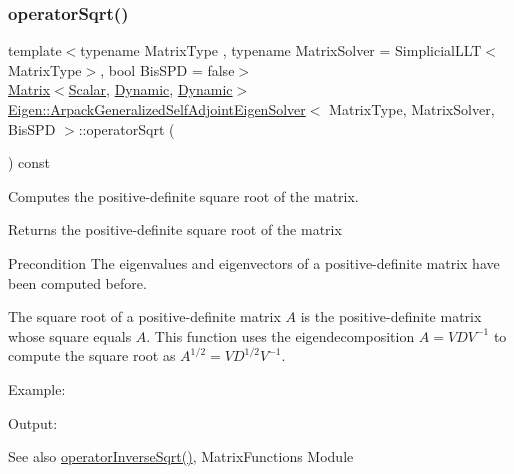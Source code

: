 \subsubsection{\texorpdfstring{operator\+Sqrt()}{operatorSqrt()}\hspace{0.1cm}{\footnotesize\ttfamily [1/2]}}
{\footnotesize\ttfamily template$<$typename Matrix\+Type , typename Matrix\+Solver  = Simplicial\+L\+L\+T$<$\+Matrix\+Type$>$, bool Bis\+S\+PD = false$>$ \\
\hyperlink{group___core___module_class_eigen_1_1_matrix}{Matrix}$<$\hyperlink{class_eigen_1_1_arpack_generalized_self_adjoint_eigen_solver_ab1182405bfe87a505d4b7a8311c661ec}{Scalar}, \hyperlink{namespace_eigen_ad81fa7195215a0ce30017dfac309f0b2}{Dynamic}, \hyperlink{namespace_eigen_ad81fa7195215a0ce30017dfac309f0b2}{Dynamic}$>$ \hyperlink{class_eigen_1_1_arpack_generalized_self_adjoint_eigen_solver}{Eigen\+::\+Arpack\+Generalized\+Self\+Adjoint\+Eigen\+Solver}$<$ Matrix\+Type, Matrix\+Solver, Bis\+S\+PD $>$\+::operator\+Sqrt (\begin{DoxyParamCaption}{ }\end{DoxyParamCaption}) const\hspace{0.3cm}{\ttfamily [inline]}}



Computes the positive-\/definite square root of the matrix. 

\begin{DoxyReturn}{Returns}
the positive-\/definite square root of the matrix
\end{DoxyReturn}
\begin{DoxyPrecond}{Precondition}
The eigenvalues and eigenvectors of a positive-\/definite matrix have been computed before.
\end{DoxyPrecond}
The square root of a positive-\/definite matrix $ A $ is the positive-\/definite matrix whose square equals $ A $. This function uses the eigendecomposition $ A = V D V^{-1} $ to compute the square root as $ A^{1/2} = V D^{1/2} V^{-1} $.

Example\+: 
\begin{DoxyCodeInclude}
\end{DoxyCodeInclude}
 Output\+: 
\begin{DoxyVerbInclude}
\end{DoxyVerbInclude}


\begin{DoxySeeAlso}{See also}
\hyperlink{class_eigen_1_1_arpack_generalized_self_adjoint_eigen_solver_ad55f052b675f1deaea220d0cc225622a}{operator\+Inverse\+Sqrt()}, Matrix\+Functions Module 
\end{DoxySeeAlso}


